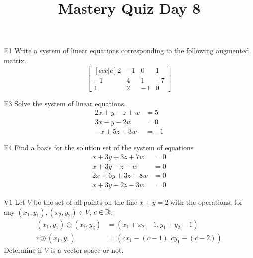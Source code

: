 \documentclass{sbgLAquiz}
\title{Mastery Quiz Day 8 }
\begin{document}
\begin{problem}{E1}
Write a system of linear equations corresponding to the following
augmented matrix.
\[
\begin{bmatrix}[ccc|c]
2 & -1 & 0 & 1  \\
-1 & 4 & 1 & -7  \\
1 & 2 & -1 & 0
\end{bmatrix}
\]
\end{problem}

\begin{problem}{E3}
Solve the system of linear equations.
\begin{align*}
2x+y-z+w &=5 \\
3x-y-2w &= 0 \\
-x+5z+3w&=-1
\end{align*}
\end{problem}
\newpage

\begin{problem}{E4}
Find a basis for the solution set of the system of equations
\begin{align*}
x+3y+3z+7w &= 0 \\
 x+3y-z-w &= 0 \\
  2x+6y+3z+8w &= 0 \\
   x+3y-2z-3w &= 0
\end{align*}
\end{problem}

\begin{problem}{V1}
Let $V$ be the set of all points on the line $x+y=2$ with the operations, for any $(x_1,y_1), (x_2,y_2) \in V$, $c \in \mathbb{R}$,
\begin{align*}
(x_1,y_1) \oplus (x_2,y_2) &= (x_1+x_2-1,y_1+y_2-1) \\
c \odot (x_1,y_1) &= (cx_1-(c-1), cy_1-(c-2))
\end{align*}
Determine if $V$ is a vector space or not.
\end{problem}
\end{document}
